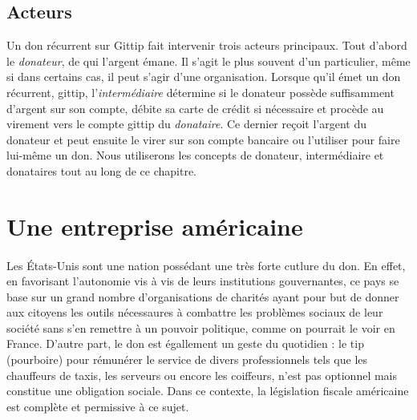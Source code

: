         \subsection{Acteurs}
            Un don récurrent sur Gittip fait intervenir trois acteurs
            principaux.
            Tout d'abord le \emph{donateur}, de qui l'argent émane.
            Il s'agit le plus souvent d'un particulier, même si dans
            certains cas, il peut s'agir d'une organisation.
            Lorsque qu'il émet un don récurrent, gittip,
            l'\emph{intermédiaire} détermine si
            le donateur possède suffisamment d'argent sur son compte,
            débite sa carte de crédit si nécessaire et procède au
            virement vers le compte gittip du \emph{donataire}. Ce dernier
            reçoit l'argent du donateur et peut ensuite le virer sur son
            compte bancaire ou l'utiliser pour faire lui-même un don.
            Nous utiliserons les concepts de donateur, intermédiaire et
            donataires tout au long de ce chapitre.
    \section{Une entreprise américaine}
        \paragraph{}
            Les États-Unis sont une nation possédant une très forte cutlure
            du don. En effet, en favorisant l'autonomie vis à vis de leurs
            institutions gouvernantes, ce pays se base sur un grand nombre
            d'organisations de charités ayant pour but de donner aux citoyens
            les outils nécessaures à combattre les problèmes sociaux de leur
            société sans s'en remettre à un pouvoir politique, comme on
            pourrait le voir en France.
            D'autre part, le don est égallement un geste du quotidien :
            le tip (pourboire) pour rémunérer le service de divers
            professionnels tels que les chauffeurs de taxis, les serveurs ou
            encore les coiffeurs, n'est pas optionnel mais constitue une
            obligation sociale.
            Dans ce contexte, la législation fiscale américaine est
            complète et permissive à ce sujet.
